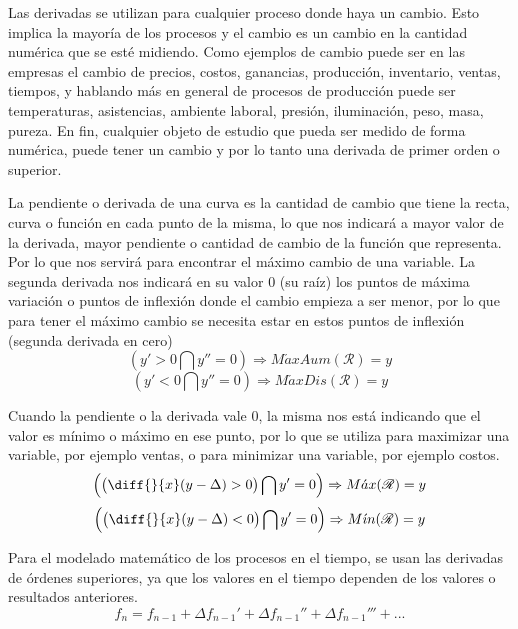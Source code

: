 \documentclass[oneside,spanish,letterpaper]{extbook}
\theoremstyle{mythmstyle}
\begin{document}
Las derivadas se utilizan para cualquier proceso donde haya un cambio. Esto implica la mayoría de los procesos y el cambio es un cambio
en la cantidad numérica que se esté midiendo.
Como ejemplos de cambio puede ser en las empresas el cambio de precios, costos, ganancias, producción, inventario, ventas, tiempos, 
y hablando más en general de procesos de producción puede ser temperaturas, asistencias, ambiente laboral, presión, iluminación, peso, masa,
pureza. En fin, cualquier objeto de estudio que pueda ser medido de forma numérica, puede tener un cambio y por lo tanto una derivada de primer
orden o superior.

La pendiente o derivada de una curva es la cantidad de cambio que tiene la recta, curva o función en cada punto de la misma, lo que nos indicará 
a mayor valor de la derivada, mayor pendiente o cantidad de cambio de la función que representa. Por lo que nos servirá para encontrar el máximo 
cambio de una variable. La segunda derivada nos indicará en su valor 0 (su raíz) los puntos de máxima variación o puntos de inflexión donde el 
cambio empieza a ser menor, por lo que para tener el máximo cambio se necesita estar en estos puntos de inflexión (segunda derivada en cero)
\begin{equation}
 \left(y'>0 \bigcap y''=0\right) \Rightarrow M\acute{a}xAum(\mathscr{R})= y 
\end{equation}
\begin{equation}
 \left(y'<0 \bigcap y''=0\right) \Rightarrow M\acute{a}xDis(\mathscr{R})= y 
\end{equation}

Cuando la pendiente o la derivada vale 0, la misma nos está indicando que el valor es mínimo o máximo en ese punto, por lo que se utiliza para 
maximizar una variable, por ejemplo ventas, o para minimizar una variable, por ejemplo costos.
\begin{equation}\label{max}
 \left(\left(\diff{}{x}(y-\Delta)>0\right) \bigcap y'=0\right) \Rightarrow M\acute{a}x(\mathscr{R})= y 
\end{equation}
\begin{equation}\label{min}
 \left(\left(\diff{}{x}(y-\Delta)<0\right) \bigcap y'=0\right) \Rightarrow M\acute{\imath}n(\mathscr{R})= y 
\end{equation}

Para el modelado matemático de los procesos en el tiempo, se usan las derivadas de órdenes superiores, ya que los valores en el tiempo
dependen de los valores o resultados anteriores.
\begin{equation}\label{modelo}
 f_n=f_{n-1}+\Delta f_{n-1}'+\Delta f_{n-1}''+\Delta f_{n-1}'''+...
\end{equation}
\end{document}
